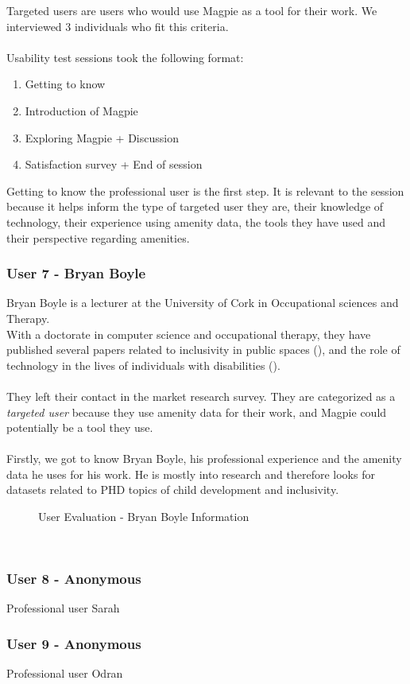 Targeted users are users who would use Magpie as a tool for their work. We interviewed 3 individuals who fit this criteria.\\ \\
Usability test sessions took the following format:
\begin{enumerate}
    \item Getting to know
    \item Introduction of Magpie
    \item Exploring Magpie + Discussion
    \item Satisfaction survey + End of session
\end{enumerate}
Getting to know the professional user is the first step. It is relevant to the session because it helps inform the type of targeted user they are, their knowledge of technology, their experience using amenity data, the tools they have used and their perspective regarding amenities.

\subsubsection{User 7 - Bryan Boyle}
Bryan Boyle is a lecturer at the University of Cork in Occupational sciences and Therapy.\\ With a doctorate in computer science and occupational therapy, they have published several papers related to inclusivity in public spaces (\cite{bryanboyleplaygroundinclusion2023}), and the role of technology in the lives of individuals with disabilities (\cite{bryanboylechildrenautism2022}).\\ \\
They left their contact in the market research survey. They are categorized as a \emph{targeted user} because they use amenity data for their work, and Magpie could potentially be a tool they use.\\ \\

Firstly, we got to know Bryan Boyle, his professional experience and the amenity data he uses for his work. He is mostly into research and therefore looks for datasets related to PHD topics of child development and inclusivity.
\begin{figure}[h!]
    \centering
    \caption{User Evaluation - Bryan Boyle Information}
\end{figure}\\


\newpage
\subsubsection{User 8 - Anonymous}
Professional user Sarah

\newpage
\subsubsection{User 9 - Anonymous}
Professional user Odran
